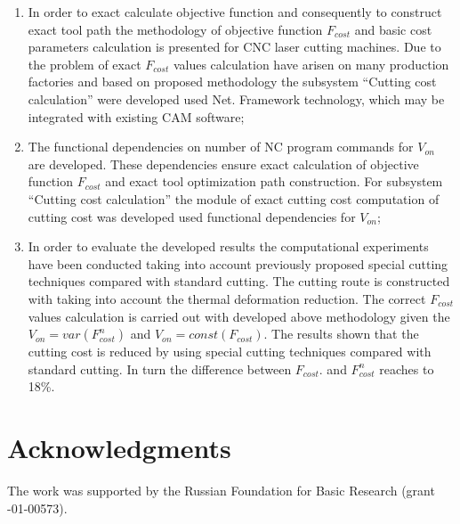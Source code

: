 \documentclass[runningheads]{llncs}
\begin{document}
\begin{enumerate}

\item
In order to exact calculate objective function and consequently
to construct exact tool path the methodology of objective function
$F_{cost}$
and basic cost parameters calculation
is presented for CNC laser cutting machines.
Due to the problem of exact
$F_{cost}$
values calculation have arisen on many production factories
and based on proposed methodology the subsystem
``Cutting cost calculation''
were developed used Net. Framework technology,
which may be integrated with existing CAM software;

\item
The functional dependencies on number of NC program commands for
$V_{on}$
are developed.
These dependencies ensure exact calculation
of objective function
$F_{cost}$
and exact tool optimization path construction.
For subsystem ``Cutting cost calculation''
the module of exact cutting cost computation
of cutting cost was developed used functional dependencies for
$V_{on}$;

\item
In order to evaluate the developed results
the computational experiments have been conducted
taking into account previously proposed
special cutting techniques compared with standard cutting.
The cutting route is constructed
with taking into account the thermal deformation reduction.
The correct
$F_{cost}$
values calculation is carried out
with developed above methodology given the
$V_{on} = var(F_{cost}^n)$
and
$V_{on} = const(F_{cost})$.
The results shown that
the cutting cost is reduced by using special cutting techniques
compared with standard cutting.
In turn the difference between
$F_{cost}$.
and
$F_{cost}^n$
reaches to 18\%.

\end{enumerate}

\section{Acknowledgments}
The work was supported by the Russian Foundation for Basic Research
(grant -01-00573).



\end{document}
